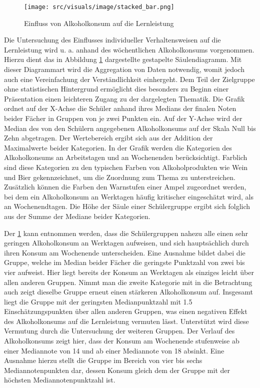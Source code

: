 \clearpage
\begin{figure}[htb]
    \centering
    \texttt{[image: src/visuals/image/stacked\_bar.png]}
    \caption{Einfluss von Alkoholkonsum auf die Lernleistung}
    \label{fig:stacked_bar}
\end{figure}

Die Untersuchung des Einflusses individueller Verhaltensweisen auf die Lernleistung wird u. a. anhand des wöchentlichen Alkoholkonsums vorgenommen.
Hierzu dient das in Abbildung \ref{fig:stacked_bar} dargestellte gestapelte Säulendiagramm.
Mit dieser Diagrammart wird die Aggregation von Daten notwendig, womit jedoch auch eine Vereinfachung der Verständlichkeit einhergeht.
Dem Teil der Zielgruppe ohne statistischen Hintergrund ermöglicht dies besonders zu Beginn einer Präsentation einen leichteren Zugang zu der dargelegten Thematik.
Die Grafik ordnet auf der X-Achse die Schüler anhand ihres Medians der finalen Noten beider Fächer in Gruppen von je zwei Punkten ein.
Auf der Y-Achse wird der Median des von den Schülern angegebenen Alkoholkonsums auf der Skala Null bis Zehn abgetragen.
Der Wertebereich ergibt sich aus der Addition der Maximalwerte beider Kategorien.
In der Grafik werden die Kategorien des Alkoholkonsums an Arbeitstagen und an Wochenenden berücksichtigt.
Farblich sind diese Kategorien zu den typischen Farben von Alkoholprodukten wie Wein und Bier gekennzeichnet, um die Zuordnung zum Thema zu unterstreichen.
Zusätzlich können die Farben den Warnstufen einer Ampel zugeordnet werden, bei dem ein Alkoholkonsum an Werktagen häufig kritischer eingeschätzt wird, als an Wochenendtagen.
Die Höhe der Säule einer Schülergruppe ergibt sich folglich aus der Summe der Mediane beider Kategorien.

Der \ref*{fig:stacked_bar} kann entnommen werden, dass die Schülergruppen nahezu alle einen sehr geringen Alkoholkonsum an Werktagen aufweisen, und sich hauptsächlich durch ihren Konsum am Wochenende unterscheiden.
Eine Ausnahme bildet dabei die Gruppe, welche im Median beider Fächer die geringste Punktzahl von zwei bis vier aufweist. 
Hier liegt bereits der Konsum an Werktagen als einziges leicht über allen anderen Gruppen.
Nimmt man die zweite Kategorie mit in die Betrachtung auch zeigt dieselbe Gruppe erneut einen stärkeren Alkoholkonsum auf.
Insgesamt liegt die Gruppe mit der geringsten Medianpunktzahl mit 1.5 Einschätzungspunkten über allen anderen Gruppen, was einen negativen Effekt des Alkoholkonsums auf die Lernleistung vermuten lässt.
Unterstützt wird diese Vermutung durch die Untersuchung der weiteren Gruppen. 
Der Verlauf des Alkoholkonsums zeigt hier, dass der Konsum am Wochenende stufenweise ab einer Mediannote von 14 und ab einer Mediannote von 18 absinkt. 
Eine Ausnahme hierzu stellt die Gruppe im Bereich von vier bis sechs Mediannotenpunkten dar, dessen Konsum gleich dem der Gruppe mit der höchsten Mediannotenpunktzahl ist.

